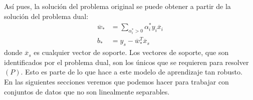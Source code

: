 \documentclass[11pt]{article}
\newcommand{\wv}{\overline{w}}
\newcommand{\x}{\overline{x}}
\newcommand{\bo}{b_{*}}
\newcommand{\wo}{\wv_{*}}
\newcommand{\alio}{\alpha_{i}^{*}}
\begin{document}
Así pues, la solución del problema original se puede obtener a partir de la solución del problema dual:
\begin{equation*}
\begin{aligned}
\wo&=\sum_{\alio>0}\alio y_{i}\x_{i}\\
\bo&=y_{s}-\wo^{T}\x_{s}
\end{aligned}
\end{equation*}
donde $\x_{s}$ es cualquier vector de soporte. Los vectores de soporte, que son identificados por el problema dual, son los únicos que se requieren para resolver $(P)$. Esto es parte de lo que hace a este modelo de aprendizaje tan robusto.\\

En las siguientes secciones veremos que podemos hacer para trabajar con conjuntos de datos que no son linealmente separables.
\end{document}
